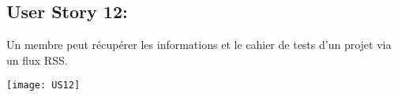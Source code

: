 \newpage{}
\subsection{User Story 12:}
Un membre peut récupérer les informations et le cahier de tests d'un projet via un flux RSS.

  \begin{center}
        \texttt{[image: US12]}
  \end{center}